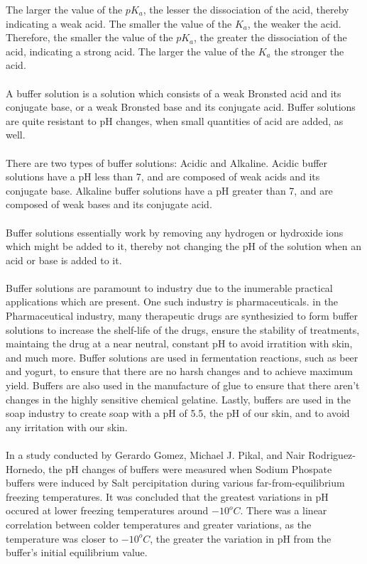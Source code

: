 \documentclass{article}
\begin{document}
\noindent
The larger the value of the $pK_a$, the lesser the dissociation of the acid, thereby indicating a weak acid. The smaller the value of the $K_a$, the weaker the acid. Therefore, the smaller the value of the $pK_a$, the greater the dissociation of the acid, indicating a strong acid. The larger the value of the $K_a$ the stronger the acid. \\\\
\noindent
A buffer solution is a solution which consists of a weak Bronsted acid and its conjugate base, or a weak Bronsted base and its conjugate acid. Buffer solutions are quite resistant to pH changes, when small quantities of acid are added, as well. \\\\
\noindent
There are two types of buffer solutions: Acidic and Alkaline. Acidic buffer solutions have a pH less than 7, and are composed of weak acids and its conjugate base. Alkaline buffer solutions have a pH greater than 7, and are composed of weak bases and its conjugate acid. \\\\
\noindent
Buffer solutions essentially work by removing any hydrogen or hydroxide ions which might be added to it, thereby not changing the pH of the solution when an acid or base is added to it. \\\\
\noindent
Buffer solutions are paramount to industry due to the inumerable practical applications which are present. One such industry is pharmaceuticals. in the Pharmaceutical industry, many therapeutic drugs are synthesizied to form buffer solutions to increase the shelf-life of the drugs, ensure the stability of treatments,  maintaing the drug at a near neutral, constant pH to avoid irratition with skin, and much more. 
Buffer solutions are used in fermentation reactions, such as beer and yogurt, to ensure that there are no harsh changes and to achieve maximum yield. Buffers are also used in the manufacture of glue to ensure that there aren't changes in the highly sensitive chemical gelatine. Lastly, buffers are used in the soap industry to create soap with a pH of 5.5, the pH of our skin, and to avoid any irritation with our skin. \\\\
\noindent
In a study conducted by Gerardo Gomez, Michael J. Pikal, and Nair Rodriguez-Hornedo, the pH changes of buffers were measured when Sodium Phospate buffers were induced by Salt percipitation during various far-from-equilibrium freezing temperatures. It was concluded that the greatest variations in pH occured at lower freezing temperatures around $-10^o C$. There was a linear correlation between colder temperatures and greater variations, as the temperature was closer to $-10^o C$, the greater the variation in pH from the buffer's initial equilibrium value. \\\\
\end{document}
